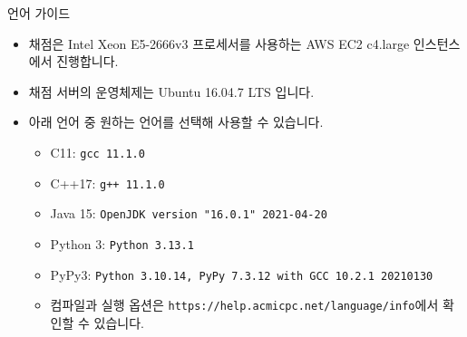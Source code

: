 {
    \indent
    \Large
    
    언어 가이드
}

\begin{itemize}[noitemsep]

    \item 채점은 Intel Xeon E5-2666v3 프로세서를 사용하는 AWS EC2 c4.large 인스턴스에서 진행합니다.
    \item 채점 서버의 운영체제는 Ubuntu 16.04.7 LTS 입니다.
    \item 아래 언어 중 원하는 언어를 선택해 사용할 수 있습니다.
    
    \begin{itemize}[noitemsep,topsep=0pt]
        \item C11: \texttt{gcc 11.1.0} %
        \item C++17: \texttt{g++ 11.1.0} %
        \item Java 15: \texttt{OpenJDK version "16.0.1" 2021-04-20} %
        \item Python 3: \texttt{Python 3.13.1} %
        \item PyPy3: \texttt{Python 3.10.14, PyPy 7.3.12 with GCC 10.2.1 20210130} %
        \item 컴파일과 실행 옵션은 \texttt{https://help.acmicpc.net/language/info}에서 확인할 수 있습니다.
        

\end{itemize}
\end{itemize}
